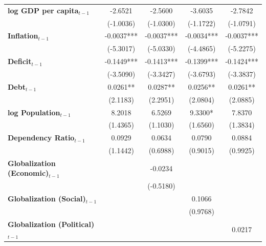 \begin{center}
\begin{tabular}{lcccc}
\textbf{log GDP per capita$_{t-1}$}           &    -2.6521     &     -2.5600      &     -3.6035      &     -2.7842       \\
\textbf{ }                         &   (-1.0036)    &    (-1.0300)     &    (-1.1722)     &    (-1.0791)      \\
\textbf{Inflation$_{t-1}$}      &   -0.0037***   &    -0.0037***    &    -0.0034***    &    -0.0037***     \\
\textbf{ }                         &   (-5.3017)    &    (-5.0330)     &    (-4.4865)     &    (-5.2275)      \\
\textbf{Deficit$_{t-1}$}             &   -0.1449***   &    -0.1413***    &    -0.1399***    &    -0.1424***     \\
\textbf{ }                         &   (-3.5090)    &    (-3.3427)     &    (-3.6793)     &    (-3.3837)      \\
\textbf{Debt$_{t-1}$}                &    0.0261**    &     0.0287**     &     0.0256**     &     0.0261**      \\
\textbf{ }                         &    (2.1183)    &     (2.2951)     &     (2.0804)     &     (2.0885)      \\
\textbf{log Population$_{t-1}$}      &     8.2018     &      6.5269      &     9.3300*      &      7.8370       \\
\textbf{ }                         &    (1.4365)    &     (1.1030)     &     (1.6560)     &     (1.3834)      \\
\textbf{Dependency Ratio$_{t-1}$}   &     0.0929     &      0.0634      &      0.0790      &      0.0884       \\
\textbf{ }                         &    (1.1442)    &     (0.6988)     &     (0.9015)     &     (0.9925)      \\
\textbf{Globalization (Economic)$_{t-1}$}             &                &     -0.0234      &                  &                   \\
\textbf{ }                         &                &    (-0.5180)     &                  &                   \\
\textbf{Globalization (Social)$_{t-1}$}             &                &                  &      0.1066      &                   \\
\textbf{ }                         &                &                  &     (0.9768)     &                   \\
\textbf{Globalization (Political)$_{t-1}$}             &                &                  &                  &      0.0217       \\

\end{tabular}
\end{center}
